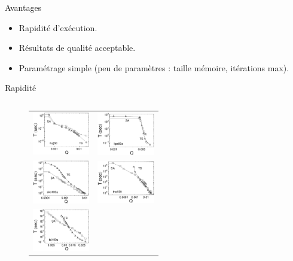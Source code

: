 \documentclass{beamer}
\begin{document}
\begin{frame}{Avantages}
    \begin{itemize}
        \item Rapidité d'exécution.
        \item Résultats de qualité acceptable.
        \item Paramétrage simple (peu de paramètres : taille mémoire, itérations max).
    \end{itemize}
\end{frame}

\begin{frame}{Rapidité}
    \begin{columns}
        \begin{column}{0.6\textwidth}
            \begin{figure}[ht]
                \begin{center}
                    \begin{tabular}{cc}
                        \includegraphics[width=2.5cm]{figures/pnug30Ro.eps}   &
                        \includegraphics[width=2.5cm]{figures/plipa90aRo.eps}   \\
                        \includegraphics[width=2.5cm]{figures/psko100aRo.eps} &
                        \includegraphics[width=2.5cm]{figures/ptho150Ro.eps}    \\
                        \includegraphics[width=2.5cm]{figures/ptai100aRo.eps} &

\end{tabular}
\end{center}
\end{figure}
\end{column}
\end{columns}
\end{frame}
\end{document}
